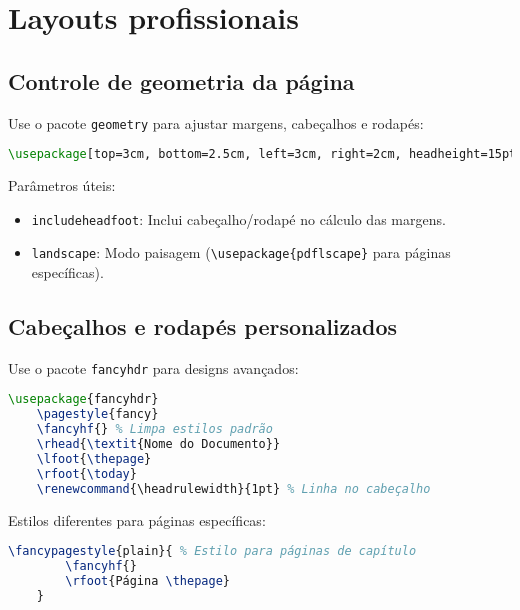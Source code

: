 \chapter{Layouts profissionais}



\section{Controle de geometria da página}

Use o pacote \verb|geometry| para ajustar margens, cabeçalhos e rodapés:

\begin{lstlisting}[language=tex, caption=Configuração da geometria das páginas]
    \usepackage[top=3cm, bottom=2.5cm, left=3cm, right=2cm, headheight=15pt]{geometry}
\end{lstlisting}    

Parâmetros úteis:
\begin{itemize}
    \item \verb|includeheadfoot|: Inclui cabeçalho/rodapé no cálculo das margens.
    \item \verb|landscape|: Modo paisagem (\verb|\usepackage{pdflscape}| para páginas específicas).
\end{itemize}

\section{Cabeçalhos e rodapés personalizados}

Use o pacote \verb|fancyhdr| para designs avançados:

\begin{lstlisting}[language=tex, caption=Usando o pacote \texttt{fancyhdr} para personalização de estilo]
    \usepackage{fancyhdr}
    \pagestyle{fancy}
    \fancyhf{} % Limpa estilos padrão
    \rhead{\textit{Nome do Documento}} 
    \lfoot{\thepage}
    \rfoot{\today}
    \renewcommand{\headrulewidth}{1pt} % Linha no cabeçalho
\end{lstlisting}   

Estilos diferentes para páginas específicas:

\begin{lstlisting}[language=tex, caption=Estilizando páginas específicas]
    \fancypagestyle{plain}{ % Estilo para páginas de capítulo
        \fancyhf{}
        \rfoot{Página \thepage}
    }
\end{lstlisting}   

